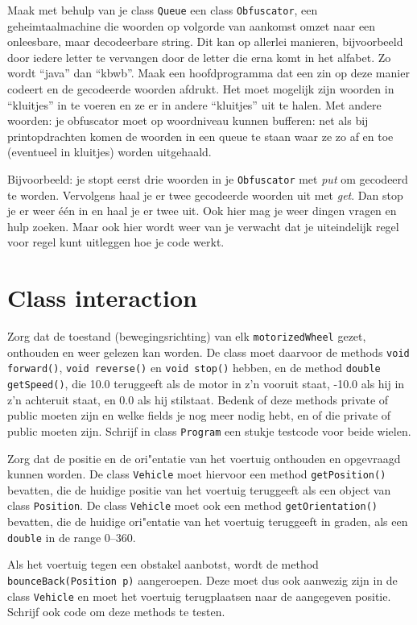 \documentclass[a4paper,10pt]{article}
\newcommand{\code}[1]{\texttt{#1}}
\begin{document}
Maak met behulp van je class \code{Queue} een class \code{Obfuscator}, een geheimtaalmachine die woorden op volgorde van aankomst omzet naar een onleesbare, maar decodeerbare string. Dit kan op allerlei manieren, bijvoorbeeld door iedere letter te vervangen door de letter die erna komt in het alfabet. Zo wordt ``java'' dan ``kbwb''.
Maak een hoofdprogramma dat een zin op deze manier codeert en de gecodeerde woorden afdrukt.
Het moet mogelijk zijn woorden in ``kluitjes'' in te voeren en ze er in andere ``kluitjes'' uit te halen.
Met andere woorden: je obfuscator moet op woordniveau kunnen bufferen:
net als bij printopdrachten komen de woorden in een queue te staan waar ze zo af en toe (eventueel in kluitjes) worden uitgehaald.

Bijvoorbeeld: je stopt eerst drie woorden in je \code{Obfuscator} met \emph{put} om gecodeerd te worden. Vervolgens haal je er twee gecodeerde woorden uit met \emph{get}. Dan stop je er weer één in en haal je er twee uit. 
Ook hier mag je weer dingen vragen en hulp zoeken.
Maar ook hier wordt weer van je verwacht dat je uiteindelijk regel voor regel kunt uitleggen hoe je code werkt.

\section{Class interaction}
Zorg dat de toestand (bewegingsrichting) van elk \code{motorizedWheel} gezet, onthouden en weer gelezen kan worden. De class moet daarvoor de methods \code{void forward()}, \code{void reverse()} en \code{void stop()} hebben, en de method \code{double getSpeed()}, die 10.0 teruggeeft als de motor in z'n vooruit staat, -10.0 als hij in z'n achteruit staat, en 0.0 als hij stilstaat. Bedenk of deze methods private of public moeten zijn en welke fields je nog meer nodig hebt, en of die private of public moeten zijn. Schrijf in class \code{Program} een stukje testcode voor beide wielen.

Zorg dat de positie en de ori"entatie van het voertuig onthouden en opgevraagd kunnen worden. De class \code{Vehicle} moet hiervoor een method \code{getPosition()} bevatten, die de huidige positie van het voertuig teruggeeft als een object van class \code{Position}. De class \code{Vehicle} moet ook een method \code{getOrientation()} bevatten, die de huidige ori"entatie van het voertuig teruggeeft in graden, als een \code{double} in de range 0--360.

Als het voertuig tegen een obstakel aanbotst, wordt de method \code{bounceBack(Position p)} aangeroepen. Deze moet dus ook aanwezig zijn in de class \code{Vehicle} en moet het voertuig terugplaatsen naar de aangegeven positie. Schrijf ook code om deze methods te testen.
\end{document}
